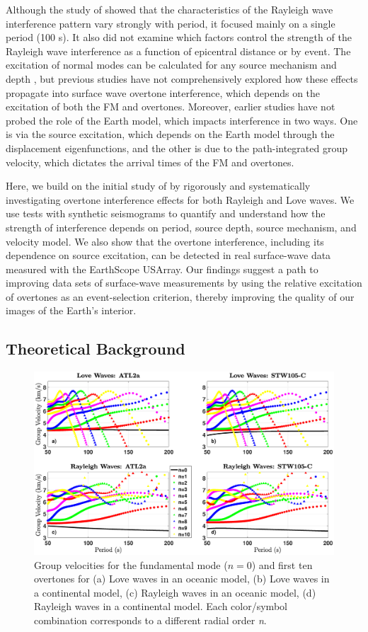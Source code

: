 \documentclass[extra,mreferee]{gji}
\begin{document}
Although the study of \citet{hariharan2020evidence} showed that the characteristics of the Rayleigh wave interference pattern vary strongly with period, it focused mainly on a single period (100 s). It also did not examine which factors control the strength of the Rayleigh wave interference as a function of epicentral distance or by event. The excitation of normal modes can be calculated for any source mechanism and depth \citep{dziewonski1981determination,dahlen1998theoretical}, but previous studies have not comprehensively explored how these effects propagate into surface wave overtone interference, which depends on the excitation of both the FM and overtones. Moreover, earlier studies have not probed the role of the Earth model, which impacts interference in two ways. One is via the source excitation, which depends on the Earth model through the displacement eigenfunctions, and the other is due to the path-integrated group velocity, which dictates the arrival times of the FM and overtones. 

Here, we build on the initial study of \citet{hariharan2020evidence} by rigorously and systematically investigating overtone interference effects for both Rayleigh and Love waves. We use tests with synthetic seismograms to quantify and understand how the strength of interference depends on period, source depth, source mechanism, and velocity model. We also show that the overtone interference, including its dependence on source excitation, can be detected in real surface-wave data measured with the EarthScope USArray. Our findings suggest a path to improving data sets of surface-wave measurements by using the relative excitation of overtones as an event-selection criterion, thereby improving the quality of our images of the Earth's interior.

 \subsection{Theoretical Background}

 \begin{figure}
 \includegraphics[width=1.0\textwidth]{Fig1.eps}
 \protect \caption{Group velocities for the fundamental mode ($n=0$) and first ten overtones for (a) Love waves in an oceanic model, (b) Love waves in a continental model, (c) Rayleigh waves in an oceanic model, (d) Rayleigh waves in a continental model. Each color/symbol combination corresponds to a different radial order \textit{n}.}
 \end{figure}
 
\end{document}

